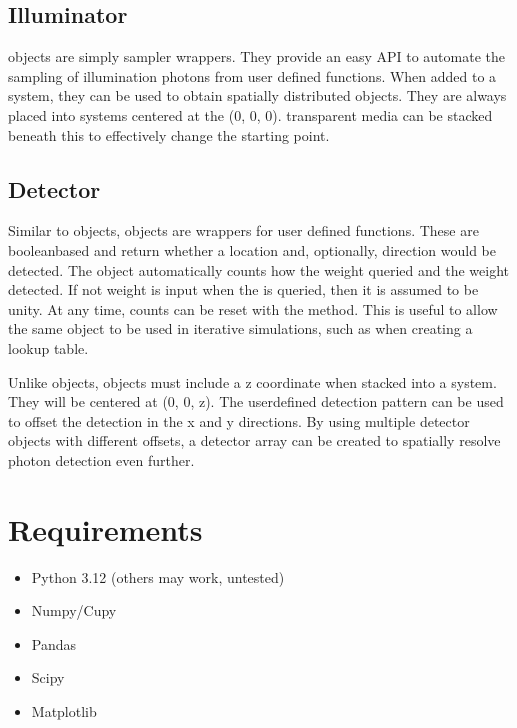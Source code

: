 \documentclass[letterpaper,10pt,english]{sphinxmanual}
\begin{document}
\subsection{Illuminator}
\label{\detokenize{README:illuminator}}
\sphinxAtStartPar
{} objects are simply sampler wrappers. They provide an easy API to automate the sampling of illumination
photons from user defined functions. When added to a system, they can be used to obtain spatially distributed 
objects. They are always placed into systems centered at the (0, 0, 0). transparent media can be stacked beneath this to
effectively change the starting point.


\subsection{Detector}
\label{\detokenize{README:detector}}
\sphinxAtStartPar
Similar to  objects,  objects are wrappers for user defined functions. These are boolean\sphinxhyphen{}based
and return whether a location and, optionally, direction would be detected. The object automatically counts how the
weight queried and the weight detected. If not weight is input when the  is queried, then it is assumed to be
unity. At any time, counts can be reset with the  method. This is useful to allow the same object to be used
in iterative simulations, such as when creating a lookup table.

\sphinxAtStartPar
Unlike  objects,  objects must include a z coordinate when stacked into a system. They will be
centered at (0, 0, z). The user\sphinxhyphen{}defined detection pattern can be used to offset the detection in the x and y directions.
By using multiple detector objects with different offsets, a detector array can be created to spatially resolve photon
detection even further.


\section{Requirements}
\label{\detokenize{README:requirements}}\begin{itemize}
\item {} 
\sphinxAtStartPar
Python 3.12 (others may work, untested)

\item {} 
\sphinxAtStartPar
Numpy/Cupy

\item {} 
\sphinxAtStartPar
Pandas

\item {} 
\sphinxAtStartPar
Scipy

\item {} 
\sphinxAtStartPar
Matplotlib

\end{itemize}
\end{document}
